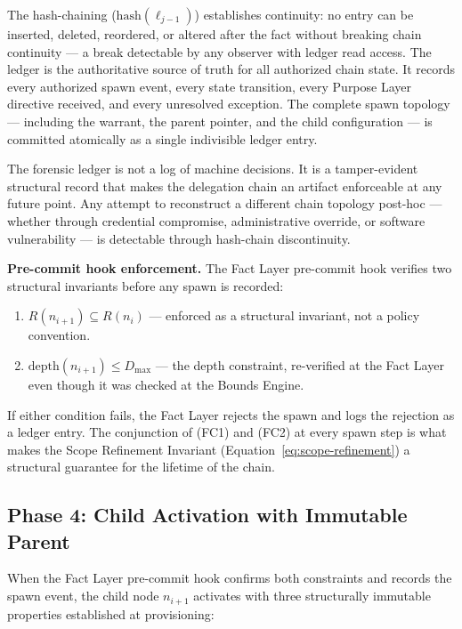 The hash-chaining ($\text{hash}(\ell_{j-1})$) establishes continuity: no entry can be inserted, deleted, reordered, or altered after the fact without breaking chain continuity — a break detectable by any observer with ledger read access. The ledger is the authoritative source of truth for all authorized chain state. It records every authorized spawn event, every state transition, every Purpose Layer directive received, and every unresolved exception. The complete spawn topology — including the warrant, the parent pointer, and the child configuration — is committed atomically as a single indivisible ledger entry.

The forensic ledger is not a log of machine decisions. It is a tamper-evident structural record that makes the delegation chain an artifact enforceable at any future point. Any attempt to reconstruct a different chain topology post-hoc — whether through credential compromise, administrative override, or software vulnerability — is detectable through hash-chain discontinuity.

\medskip
\noindent\textbf{Pre-commit hook enforcement.} The Fact Layer pre-commit hook verifies two structural invariants before any spawn is recorded:

\begin{enumerate}
    \item[(FC1)] $R(n_{i+1}) \subseteq R(n_i)$ — enforced as a structural invariant, not a policy convention.
    \item[(FC2)] $\text{depth}(n_{i+1}) \leq D_{\max}$ — the depth constraint, re-verified at the Fact Layer even though it was checked at the Bounds Engine.
\end{enumerate}

If either condition fails, the Fact Layer rejects the spawn and logs the rejection as a ledger entry. The conjunction of (FC1) and (FC2) at every spawn step is what makes the Scope Refinement Invariant (Equation~\ref{eq:scope-refinement}) a structural guarantee for the lifetime of the chain.

\subsection{Phase 4: Child Activation with Immutable Parent}

When the Fact Layer pre-commit hook confirms both constraints and records the spawn event, the child node $n_{i+1}$ activates with three structurally immutable properties established at provisioning:

